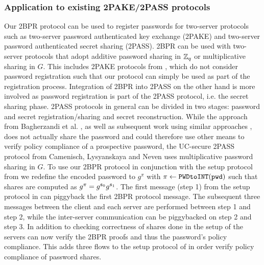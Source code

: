 \subsubsection{Application to existing 2PAKE/2PASS protocols}
Our 2BPR protocol can be used to register passwords for two-server protocols such as two-server password authenticated key exchange (2PAKE) and two-server password authenticated secret sharing (2PASS).
2BPR can be used with two-server protocols that adopt additive password sharing in $\mathbb{Z}_q$ or multiplicative sharing in $G$.
This includes 2PAKE protocols from \cite{Katz2005,Kiefer14}, which do not consider password registration such that our protocol can simply be used as part of the registration process.
Integration of 2BPR into 2PASS on the other hand is more involved as password registration is part of the 2PASS protocol, i.e. the secret sharing phase.
2PASS protocols in general can be divided in two stages: password and secret registration/sharing and secret reconstruction.
While the approach from Bagherzandi et al. \cite{Bagherzandi2011}, as well as subsequent work using similar approaches \cite{PryvalovK14,CamenischLLN14,JareckiKK14}, does not actually share the password and could therefore use other means to verify policy compliance of a prospective password, the UC-secure 2PASS protocol from Camenisch, Lysyanskaya and Neven \cite{CamenischLN2012} uses multiplicative password sharing in $G$.
To use our 2BPR protocol in conjunction with the setup protocol from \cite{CamenischLN2012} we redefine the encoded password to $g^{\pi}$ with $\pi\gets\texttt{PWDtoINT}(\mathtt{pwd})$ such that shares are computed as $g^{\pi}=g^{\mathfrak{s}_0}g^{\mathfrak{s}_1}$.
The first message (step 1) from the setup protocol in \cite{CamenischLN2012} can piggyback the first 2BPR protocol message.
The subsequent three messages between the client and each server are performed between step 1 and step 2, while the inter-server communication can be piggybacked on step 2 and step 3.
In addition to checking correctness of shares done in the setup of \cite{CamenischLN2012} the servers can now verify the 2BPR proofs and thus the password's policy compliance.
This adds three flows to the setup protocol of \cite{CamenischLN2012} in order verify policy compliance of password shares.
